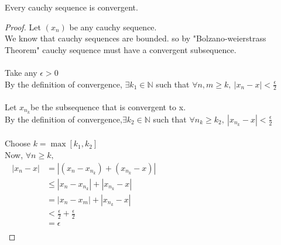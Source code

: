 \documentclass{article}
\newcommand{\hs}{\hspace}
\newcommand{\vs}{\vspace}
\newcommand{\ds}{\displaystyle}
\begin{document}
\begin{theorem}{}{}
    Every cauchy sequence is convergent.
    \begin{proof}
        Let $(x_n)$ be any cauchy sequence.\\
        We know that cauchy sequences are bounded. so by "Bolzano-weierstrass Theorem" cauchy sequence must have a convergent subsequence.\\\\
        Take any $\epsilon >0$\\
        By the definition of convergence, $\exists k_1 \in \mathbb{N}$ such that $\forall n,m \geq k,\ |x_n -x|< \ds \frac{\epsilon}{2}$\\\\
        Let $\ds x_{n_k}$be the subsequence that is convergent to x.\\
        By the definition of convergence,$\exists k_2 \in \mathbb{N}$ such that $\forall n_k \geq k_2,\ |x_{n_k} -x|< \ds \frac{\epsilon}{2}$\\\\
        Choose $k=\max[k_1,k_2]$\\
        Now, $\forall n \geq k,$
        \begin{align*}
            |x_n-x|&=|(x_n-x_{n_k})+(x_{n_k}-x)| \hs{7cm}\\
            &\leq |x_n-x_{n_k}|+|x_{n_k}-x|\\
            &= |x_n-x_m|+|x_{n_k}-x|\\
            &< \frac{\epsilon}{2}+\frac{\epsilon}{2}\\
            &= \epsilon\\
        \end{align*}   
    \end{proof}
\end{theorem}
\vs{1cm}
\end{document}
